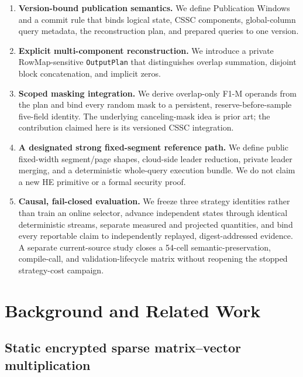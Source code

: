\begin{enumerate}
\def\labelenumi{\arabic{enumi}.}
\tightlist
\item
  \textbf{Version-bound publication semantics.} We define Publication Windows and a commit rule that binds logical state, CSSC components, global-column query metadata, the reconstruction plan, and prepared queries to one version.
\item
  \textbf{Explicit multi-component reconstruction.} We introduce a private RowMap-sensitive \texttt{OutputPlan} that distinguishes overlap summation, disjoint block concatenation, and implicit zeros.
\item
  \textbf{Scoped masking integration.} We derive overlap-only F1-M operands from the plan and bind every random mask to a persistent, reserve-before-sample five-field identity. The underlying canceling-mask idea is prior art; the contribution claimed here is its versioned CSSC integration.
\item
  \textbf{A designated strong fixed-segment reference path.} We define public fixed-width segment/page shapes, cloud-side leader reduction, private leader merging, and a deterministic whole-query execution bundle. We do not claim a new HE primitive or a formal security proof.
\item
  \textbf{Causal, fail-closed evaluation.} We freeze three strategy identities rather than train an online selector, advance independent states through identical deterministic streams, separate measured and projected quantities, and bind every reportable claim to independently replayed, digest-addressed evidence. A separate current-source study closes a 54-cell semantic-preservation, compile-call, and validation-lifecycle matrix without reopening the stopped strategy-cost campaign.
\end{enumerate}

\section{Background and Related Work}\label{background-and-related-work}

\subsection{Static encrypted sparse matrix--vector multiplication}\label{static-encrypted-sparse-matrixvector-multiplication}

